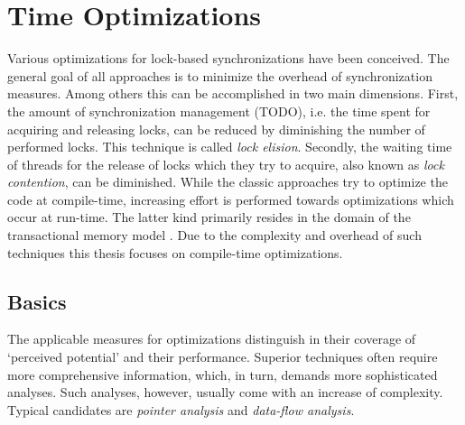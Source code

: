 \section{Time Optimizations}
Various optimizations for lock-based synchronizations have been conceived. The general goal of all approaches is to minimize the overhead of synchronization measures. Among others this can be accomplished in two main dimensions. First, the amount of synchronization management (TODO), i.e. the time spent for acquiring and releasing locks, can be reduced by diminishing the number of performed locks. This technique is called \textit{lock elision}. Secondly, the waiting time of threads for the release of locks which they try to acquire, also known as \textit{lock contention}, can be diminished. While the classic approaches try to optimize the code at compile-time, increasing effort is performed towards optimizations which occur at run-time. The latter kind primarily resides in the domain of the transactional memory model \cite{SpeculativeLockElision}\cite{ARuntimeSystem}. Due to the complexity and overhead of such techniques this thesis focuses on compile-time optimizations.

\subsection{Basics}
The applicable measures for optimizations distinguish in their coverage of `perceived potential' and their performance. Superior techniques often require more comprehensive information, which, in turn, demands more sophisticated analyses. Such analyses, however, usually come with an increase of complexity. Typical candidates are \textit{pointer analysis} and \textit{data-flow analysis}.
